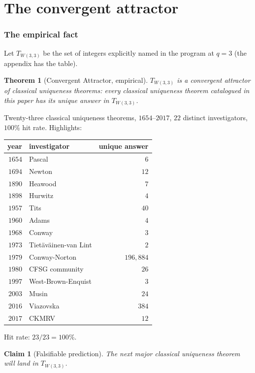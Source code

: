\documentclass[11pt]{article}
\def\textbf#1{#1}%
\newtheorem*{theorem}{Theorem}
\newtheorem*{claim}{Claim}
\begin{document}
\part{The convergent attractor}

\section{The empirical fact}

Let $T_{W(3,3)}$ be the set of integers explicitly named in the program at $q = 3$ (the appendix has the table).

\begin{theorem}[Convergent Attractor, empirical]
$T_{W(3,3)}$ is a convergent attractor of classical uniqueness theorems: every classical uniqueness theorem catalogued in this paper has its unique answer in $T_{W(3,3)}$.
\end{theorem}

Twenty-three classical uniqueness theorems, $1654$--$2017$, $22$ distinct investigators, $100\%$ hit rate. Highlights:

\begin{center}
\renewcommand{\arraystretch}{1.05}
\begin{tabular}{r l r}
\toprule
year & investigator & unique answer \\
\midrule
$1654$ & Pascal & $6$ \\
$1694$ & Newton & $12$ \\
$1890$ & Heawood & $7$ \\
$1898$ & Hurwitz & $4$ \\
$1957$ & Tits & $40$ \\
$1960$ & Adams & $4$ \\
$1968$ & Conway & $3$ \\
$1973$ & Tietäväinen-van Lint & $2$ \\
$1979$ & Conway-Norton & $196{,}884$ \\
$1980$ & CFSG community & $26$ \\
$1997$ & West-Brown-Enquist & $3$ \\
$2003$ & Musin & $24$ \\
$2016$ & Viazovska & $384$ \\
$2017$ & CKMRV & $12$ \\
\bottomrule
\end{tabular}
\end{center}

\textbf{Hit rate: $23/23 = 100\%$.}

\begin{claim}[Falsifiable prediction]
The next major classical uniqueness theorem will land in $T_{W(3,3)}$.
\end{claim}
\end{document}

